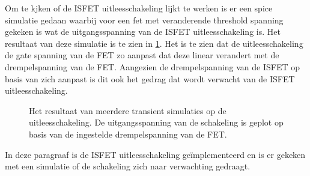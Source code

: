 
Om te kjken of de ISFET uitleesschakeling lijkt te werken is er een spice simulatie gedaan waarbij voor een fet met veranderende threshold spanning gekeken is wat de uitgangsspanning van de ISFET uitleesschakeling is. Het resultaat van deze simulatie is te zien in \cref{fig:readoutSimTrans}. Het is te zien dat de uitleesschakeling de gate spanning van de FET zo aanpast dat deze linear verandert met de drempelspanning van de FET. Aangezien de drempelspanning van de ISFET op basis van \si{\pH} zich aanpast is dit ook het gedrag dat wordt verwacht van de ISFET uitleesschakeling.
\begin{figure}[!htbp]
    \centering
    \pgfplotsset{width=0.7\textwidth}
    
    \caption{Het resultaat van meerdere transient simulaties op de uitleesschakeling. De uitgangsspanning van de schakeling is geplot op basis van de ingestelde drempelspanning van de FET.}
    \label{fig:readoutSimTrans}
\end{figure}

In deze paragraaf is de ISFET uitleesschakeling geïmplementeerd en is er gekeken met een simulatie of de schakeling zich naar verwachting gedraagt.